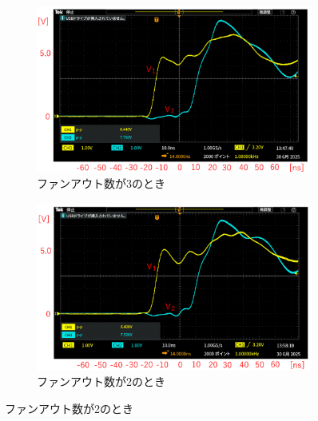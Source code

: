 \documentclass[uplatex, a4j, dvipdfmx]{jsarticle}
\begin{document}
\begin{figure}[htbp]
    \centering
    \begin{subfigure}[b]{0.48\textwidth}
        \centering
        \includegraphics[width=\linewidth]{picture/O11.png}
        \caption{ファンアウト数が3のとき}
        \label{O11}
    \end{subfigure}
    \hfill
    \begin{subfigure}[b]{0.48\textwidth}
        \centering
        \includegraphics[width=\linewidth]{picture/O12.png}
        \caption{ファンアウト数が2のとき}
        \label{O12}
    \end{subfigure}
    
    \vspace{1ex}
    

\end{figure}
\end{document}

